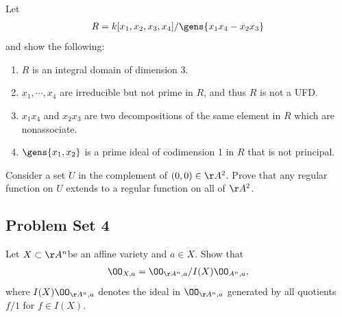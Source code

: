 \begin{exercise}[Gathmann 2.40]

Let
\begin{align*}  
R = k[x_1, x_2, x_3, x_4] / \gens{x_1 x_4 - x_2 x_3} 
\end{align*} and show the following:

\begin{enumerate}
\def\labelenumi{\alph{enumi}.}
\item
  \(R\) is an integral domain of dimension 3.
\item
  \(x_1, \cdots, x_4\) are irreducible but not prime in \(R\), and thus
  \(R\) is not a UFD.
\item
  \(x_1 x_4\) and \(x_2 x_3\) are two decompositions of the same element
  in \(R\) which are nonassociate.
\item
  \(\gens{x_1, x_2}\) is a prime ideal of codimension 1 in \(R\) that is
  not principal.
\end{enumerate}

\end{exercise}

\begin{exercise}[Problem 5]

Consider a set \(U\) in the complement of \((0, 0) \in \AA^2\). Prove
that any regular function on \(U\) extends to a regular function on all
of \(\AA^2\).

\end{exercise}

\hypertarget{problem-set-4}{%
\subsection{Problem Set 4}\label{problem-set-4}}

\begin{exercise}[Gathmann 3.20]

Let \(X\subset \AA^n\)be an affine variety and \(a\in X\). Show that
\begin{align*}  
\OO_{X, a} = \OO_{\AA^n, a} / I(X) \OO_{A^n,a}
,\end{align*} where \(I(X) \OO_{\AA^n, a}\) denotes the ideal in
\(\OO_{\AA^n, a}\) generated by all quotients \(f/1\) for \(f\in I(X)\).

\end{exercise}

